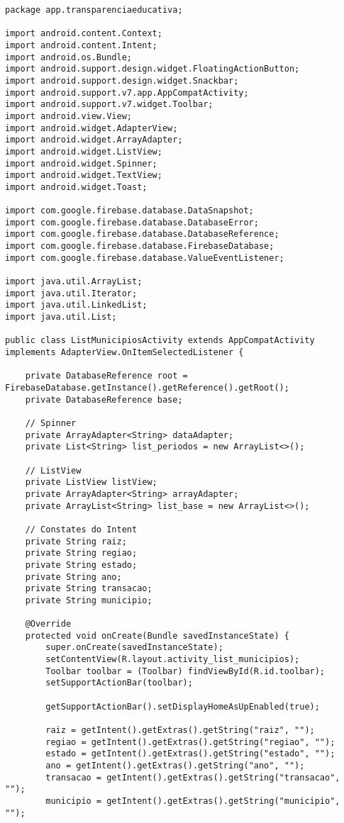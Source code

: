 \documentclass[12pt,a4paper]{article}
\begin{document}
\begin{lstlisting}[caption=./mobile/src/main/java/app/transparenciaeducativa/ListMunicipiosActivity.java]
package app.transparenciaeducativa;

import android.content.Context;
import android.content.Intent;
import android.os.Bundle;
import android.support.design.widget.FloatingActionButton;
import android.support.design.widget.Snackbar;
import android.support.v7.app.AppCompatActivity;
import android.support.v7.widget.Toolbar;
import android.view.View;
import android.widget.AdapterView;
import android.widget.ArrayAdapter;
import android.widget.ListView;
import android.widget.Spinner;
import android.widget.TextView;
import android.widget.Toast;

import com.google.firebase.database.DataSnapshot;
import com.google.firebase.database.DatabaseError;
import com.google.firebase.database.DatabaseReference;
import com.google.firebase.database.FirebaseDatabase;
import com.google.firebase.database.ValueEventListener;

import java.util.ArrayList;
import java.util.Iterator;
import java.util.LinkedList;
import java.util.List;

public class ListMunicipiosActivity extends AppCompatActivity implements AdapterView.OnItemSelectedListener {

    private DatabaseReference root = FirebaseDatabase.getInstance().getReference().getRoot();
    private DatabaseReference base;

    // Spinner
    private ArrayAdapter<String> dataAdapter;
    private List<String> list_periodos = new ArrayList<>();

    // ListView
    private ListView listView;
    private ArrayAdapter<String> arrayAdapter;
    private ArrayList<String> list_base = new ArrayList<>();

    // Constates do Intent
    private String raiz;
    private String regiao;
    private String estado;
    private String ano;
    private String transacao;
    private String municipio;

    @Override
    protected void onCreate(Bundle savedInstanceState) {
        super.onCreate(savedInstanceState);
        setContentView(R.layout.activity_list_municipios);
        Toolbar toolbar = (Toolbar) findViewById(R.id.toolbar);
        setSupportActionBar(toolbar);

        getSupportActionBar().setDisplayHomeAsUpEnabled(true);

        raiz = getIntent().getExtras().getString("raiz", "");
        regiao = getIntent().getExtras().getString("regiao", "");
        estado = getIntent().getExtras().getString("estado", "");
        ano = getIntent().getExtras().getString("ano", "");
        transacao = getIntent().getExtras().getString("transacao", "");
        municipio = getIntent().getExtras().getString("municipio", "");


\end{lstlisting}
\end{document}
